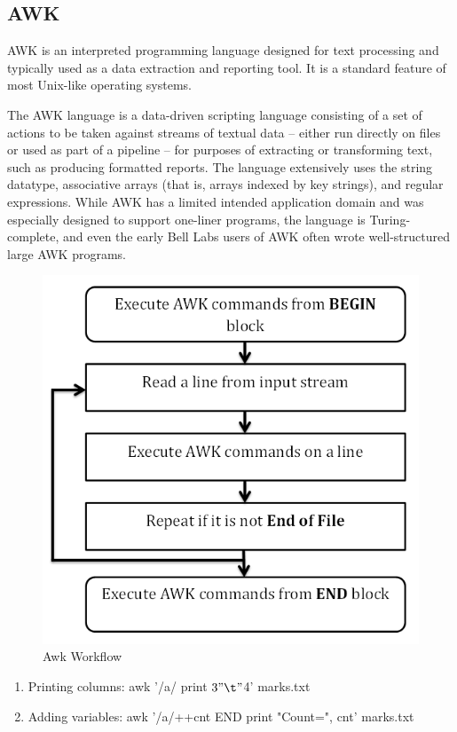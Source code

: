 \documentclass{beamer}
\begin{document}
\begin{frame}
  \subsection{AWK}
AWK is an interpreted programming language designed for text processing and typically used as a data extraction and reporting tool. It is a standard feature of most Unix-like operating systems.

The AWK language is a data-driven scripting language consisting of a set of actions to be taken against streams of textual data – either run directly on files or used as part of a pipeline – for purposes of extracting or transforming text, such as producing formatted reports. The language extensively uses the string datatype, associative arrays (that is, arrays indexed by key strings), and regular expressions. While AWK has a limited intended application domain and was especially designed to support one-liner programs, the language is Turing-complete, and even the early Bell Labs users of AWK often wrote well-structured large AWK programs.
\begin{figure}[!h]
	\begin{center}
		\includegraphics[width=0.4\columnwidth]{awk_workflow}
	\end{center}
	\caption{Awk Workflow}
        \label{fig:shapes}
\end{figure}
    \begin{enumerate}
        \item
            Printing columns:
                     awk '/a/ {print $3 "\t" $4}' marks.txt 
        \item
            Adding variables:
                     awk '/a/{++cnt} END {print "Count=", cnt}' marks.txt
  \end{enumerate}
\end{frame}
\end{document}
